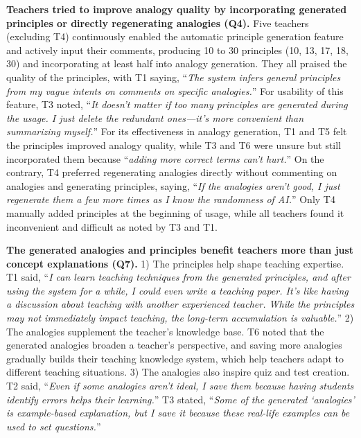 \textbf{Teachers tried to improve analogy quality by incorporating generated principles or directly regenerating analogies (Q4).} 
Five teachers (excluding T4) continuously enabled the automatic principle generation feature and actively input their comments, producing 10 to 30 principles (10, 13, 17, 18, 30) and incorporating at least half into analogy generation.
They all praised the quality of the principles, with T1 saying, ``\textit{The system infers general principles from my vague intents on comments on specific analogies.}''
For usability of this feature, T3 noted, ``\textit{It doesn’t matter if too many principles are generated during the usage. I just delete the redundant ones—it’s more convenient than summarizing myself.}'' 
For its effectiveness in analogy generation, T1 and T5 felt the principles improved analogy quality, while T3 and T6 were unsure but still incorporated them because ``\textit{adding more correct terms can't hurt.}''
On the contrary, T4 preferred regenerating analogies directly without commenting on analogies and generating principles, saying, ``\textit{If the analogies aren't good, I just regenerate them a few more times as I know the randomness of AI.}''
Only T4 manually added principles at the beginning of usage, while all teachers found it inconvenient and difficult as noted by T3 and T1.

\textbf{The generated analogies and principles benefit teachers more than just concept explanations (Q7).} 
1) The principles help shape teaching expertise. 
T1 said, ``\textit{I can learn teaching techniques from the generated principles, and after using the system for a while, I could even write a teaching paper. It’s like having a discussion about teaching with another experienced teacher. While the principles may not immediately impact teaching, the long-term accumulation is valuable.}'' 
2) The analogies supplement the teacher's knowledge base. 
T6 noted that the generated analogies broaden a teacher's perspective, and saving more analogies gradually builds their teaching knowledge system, which help teachers adapt to different teaching situations. 
3) The analogies also inspire quiz and test creation.
T2 said, ``\textit{Even if some analogies aren't ideal, I save them because having students identify errors helps their learning.}'' T3 stated, ``\textit{Some of the generated `analogies' is example-based explanation, but I save it because these real-life examples can be used to set questions.}''


